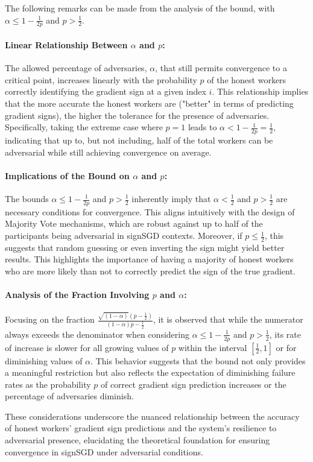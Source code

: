  
The following remarks can be made from the analysis of the bound, with $\alpha \leq 1 - \frac{1}{2p}$ and $p > \frac{1}{2}$.

\paragraph{Linear Relationship Between $\alpha$ and $p$:} The allowed percentage of adversaries, $\alpha$, that still permits convergence to a critical point, increases linearly with the probability $p$ of the honest workers correctly identifying the gradient sign at a given index $i$. This relationship implies that the more accurate the honest workers are ("better" in terms of predicting gradient signs), the higher the tolerance for the presence of adversaries. Specifically, taking the extreme case where $p = 1$ leads to $\alpha < 1 - \frac{1}{2p} = \frac{1}{2}$, indicating that up to, but not including, half of the total workers can be adversarial while still achieving convergence on average.


\paragraph{Implications of the Bound on $\alpha$ and $p$:} The bounds $\alpha \leq 1 - \frac{1}{2p}$ and $p > \frac{1}{2}$ inherently imply that $\alpha < \frac{1}{2}$ and $p > \frac{1}{2}$ are necessary conditions for convergence. This aligns intuitively with the design of Majority Vote mechanisms, which are robust against up to half of the participants being adversarial in signSGD contexts. Moreover, if $p \leq \frac{1}{2}$, this suggests that random guessing or even inverting the sign might yield better results. This highlights the importance of having a majority of honest workers who are more likely than not to correctly predict the sign of the true gradient.


\paragraph{Analysis of the Fraction Involving $p$ and $\alpha$:} Focusing on the fraction $\frac{\sqrt{(1- \alpha)}(p - \frac{1}{2})}{(1 - \alpha)p - \frac{1}{2}}$, it is observed that while the numerator always exceeds the denominator when considering $\alpha \leq 1 - \frac{1}{2p}$ and $p > \frac{1}{2}$, its rate of increase is slower for all growing values of $p$ within the interval $[\frac{1}{2}, 1]$ or for diminishing values of $\alpha$. This behavior suggests that the bound not only provides a meaningful restriction but also reflects the expectation of diminishing failure rates as the probability $p$ of correct gradient sign prediction increases or the percentage of adversaries diminish.

These considerations underscore the nuanced relationship between the accuracy of honest workers' gradient sign predictions and the system's resilience to adversarial presence, elucidating the theoretical foundation for ensuring convergence in signSGD under adversarial conditions.